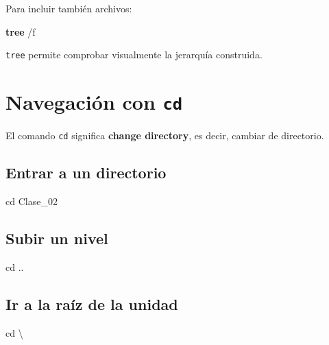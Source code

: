 \documentclass[
  spanish,
  letterpaper,
]{scrbook}
\newenvironment{Shaded}{\begin{snugshade}}{\end{snugshade}}
\newcommand{\AttributeTok}[1]{\textcolor[rgb]{0.40,0.45,0.13}{#1}}
\newcommand{\BuiltInTok}[1]{\textcolor[rgb]{0.00,0.23,0.31}{#1}}
\newcommand{\KeywordTok}[1]{\textcolor[rgb]{0.00,0.23,0.31}{\textbf{#1}}}
\newcommand{\NormalTok}[1]{\textcolor[rgb]{0.00,0.23,0.31}{#1}}
\newcommand{\SpecialCharTok}[1]{\textcolor[rgb]{0.37,0.37,0.37}{#1}}
\begin{document}
Para incluir también archivos:

\begin{Shaded}
\begin{Highlighting}[]
\KeywordTok{tree} \AttributeTok{/f}
\end{Highlighting}
\end{Shaded}

\texttt{tree} permite comprobar visualmente la jerarquía construida.


\chapter{\texorpdfstring{Navegación con
\texttt{cd}}{Navegación con cd}}\label{navegaciuxf3n-con-cd}

El comando \texttt{cd} significa \textbf{change directory}, es decir,
cambiar de directorio.

\section{Entrar a un directorio}\label{entrar-a-un-directorio}

\begin{Shaded}
\begin{Highlighting}[]
\BuiltInTok{cd}\NormalTok{ Clase\_02}
\end{Highlighting}
\end{Shaded}

\section{Subir un nivel}\label{subir-un-nivel}

\begin{Shaded}
\begin{Highlighting}[]
\BuiltInTok{cd}\NormalTok{ ..}
\end{Highlighting}
\end{Shaded}

\section{Ir a la raíz de la unidad}\label{ir-a-la-rauxedz-de-la-unidad}

\begin{Shaded}
\begin{Highlighting}[]
\BuiltInTok{cd} \SpecialCharTok{\textbackslash{}}
\end{Highlighting}
\end{Shaded}
\end{document}
